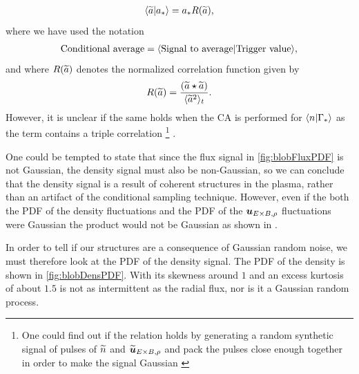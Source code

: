 %
\begin{align*}
    \langle{\widetilde{ a}}|{a_*}\rangle = a_*R(\widetilde{ a}),
\end{align*}
%
where we have used the notation
%
\begin{align*}
    \text{Conditional average} = \langle{\text{Signal to average}}|{\text{Trigger value}}\rangle,
\end{align*}
%
and where $R(\widetilde{ a})$ denotes the normalized correlation function given by
%
\begin{align*}
    R(\widetilde{ a}) = \frac{(\widetilde{ a}\star\widetilde{ a})}{\langle{\widetilde{ a}^2}\rangle_t}.
\end{align*}
%
However, it is unclear if the same holds when the CA is performed for $\langle{n}|{\Gamma_*}\rangle$ as the term contains a triple correlation%
\footnote{One could find out if the relation holds by generating a random synthetic signal of pulses of $\widetilde{ n}$ and $\widetilde{ \boldsymbol{u}}_{E\times B, \rho}$ and pack the pulses close enough together in order to make the signal Gaussian \cite{Pecseli2017Private}}%
.

One could be tempted to state that since the flux signal in \cref{fig:blobFluxPDF} is not Gaussian, the density signal must also be non-Gaussian, so we can conclude that the density signal is a result of coherent structures in the plasma, rather than an artifact of the conditional sampling technique.
However, even if the both the PDF of the density fluctuations and the PDF of the $\boldsymbol{u}_{E\times B,\rho}$ fluctuations were Gaussian the product would not be Gaussian as shown in \cite{Bergsaker2015}.

In order to tell if our structures are a consequence of Gaussian random noise, we must therefore look at the PDF of the density signal.
The PDF of the density is shown in \cref{fig:blobDensPDF}.
With its skewness around $1$ and an excess kurtosis of about $1.5$ is not as intermittent as the radial flux, nor is it a Gaussian random process.
%

